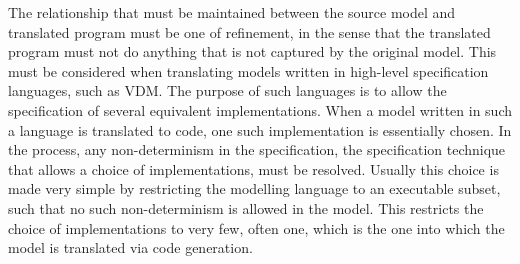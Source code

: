 The relationship that must be maintained between the source model and translated program must be one of refinement, in the sense that the translated program must not do anything that is not captured by the original model.
This must be considered when translating models written in high-level specification languages, such as VDM.
The purpose of such languages is to allow the specification of several equivalent implementations.
When a model written in such a language is translated to code, one such implementation is essentially chosen.
In the process, any non-determinism in the specification, the specification technique that allows a choice of implementations, must be resolved.
Usually this choice is made very simple by restricting the modelling language to an executable subset, such that no such non-determinism is allowed in the model.
This restricts the choice of implementations to very few, often one, which is the one into which the model is translated via code generation.

